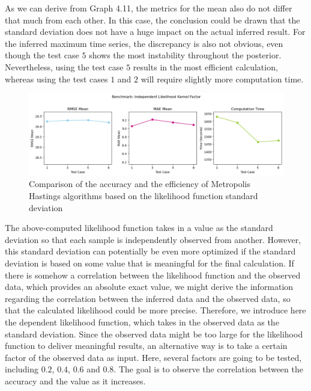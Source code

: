 As we can derive from Graph 4.11, the metrics for the mean also do not differ that much from each other. In this case, the conclusion could be drawn that the standard deviation does not have a huge impact on the actual inferred result. For the inferred maximum time series, the discrepancy is also not obvious, even though the test case $5$ shows the most instability throughout the posterior. Nevertheless, using the test case $5$ results in the most efficient calculation, whereas using the test cases $1$ and $2$ will require slightly more computation time.


\begin{figure}[H]
    \centering
    \includegraphics[width=1\textwidth]{figures/basic_mh/benchmark/sensitivity_likelihood_independent.png}
    \captionsetup{width=.8\textwidth}
    \caption{Comparison of the accuracy and the efficiency of Metropolis Hastings algorithms based on the likelihood function standard deviation}
    \label{fig:enter-label}
\end{figure}



The above-computed likelihood function takes in a value as the standard deviation so that each sample is independently observed from another. However, this standard deviation can potentially be even more optimized if the standard deviation is based on some value that is meaningful for the final calculation. If there is somehow a correlation between the likelihood function and the observed data, which provides an absolute exact value, we might derive the information regarding the correlation between the inferred data and the observed data, so that the calculated likelihood could be more precise. Therefore, we introduce here the dependent likelihood function, which takes in the observed data as the standard deviation. Since the observed data might be too large for the likelihood function to deliver meaningful results, an alternative way is to take a certain factor of the observed data as input. Here, several factors are going to be tested, including $0.2$, $0.4$, $0.6$ and $0.8$. The goal is to observe the correlation between the accuracy and the value as it increases.


